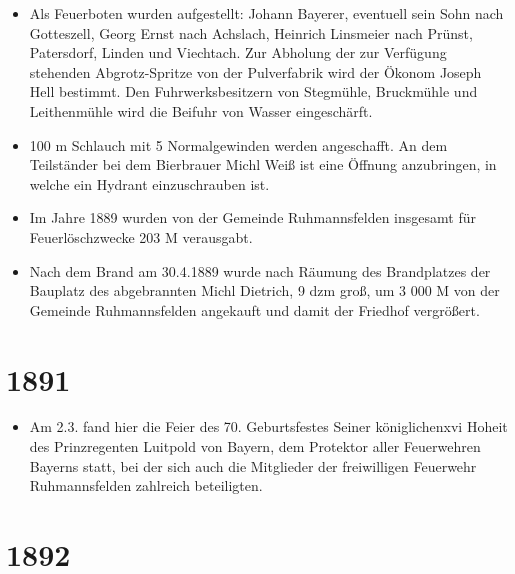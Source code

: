 \documentclass[12pt,a4paper]{book}
\begin{document}
\begin{itemize}
\item Als Feuerboten wurden aufgestellt: Johann Bayerer, eventuell sein Sohn
nach Gotteszell, Georg Ernst nach Achslach, Heinrich Linsmeier nach Prünst,
Patersdorf, Linden und Viechtach. Zur Abholung der zur Verfügung stehenden
Abgrotz-Spritze von der Pulverfabrik wird der Ökonom Joseph Hell bestimmt. Den
Fuhrwerksbesitzern von Stegmühle, Bruckmühle und Leithenmühle wird die Beifuhr
von Wasser eingeschärft.

\item 100 m Schlauch mit 5 Normalgewinden werden angeschafft. An dem Teilständer
bei dem Bierbrauer Michl Weiß ist eine Öffnung anzubringen, in welche ein
Hydrant einzuschrauben ist.

\item Im Jahre 1889 wurden von der Gemeinde Ruhmannsfelden insgesamt für
Feuerlöschzwecke 203 M verausgabt.

\item Nach dem Brand am 30.4.1889 wurde nach Räumung des Brandplatzes der
Bauplatz des abgebrannten Michl Dietrich, 9 dzm groß, um 3 000 M von der
Gemeinde Ruhmannsfelden angekauft und damit der Friedhof vergrößert.
\end{itemize}

\section*{1891}

\begin{itemize}
\item Am 2.3. fand hier die Feier des 70. Geburtsfestes Seiner königlichenxvi
Hoheit des Prinzregenten Luitpold von Bayern, dem Protektor aller Feuerwehren
Bayerns statt, bei der sich auch die Mitglieder der freiwilligen Feuerwehr
Ruhmannsfelden zahlreich beteiligten.
\end{itemize}

\section*{1892}
\end{document}
